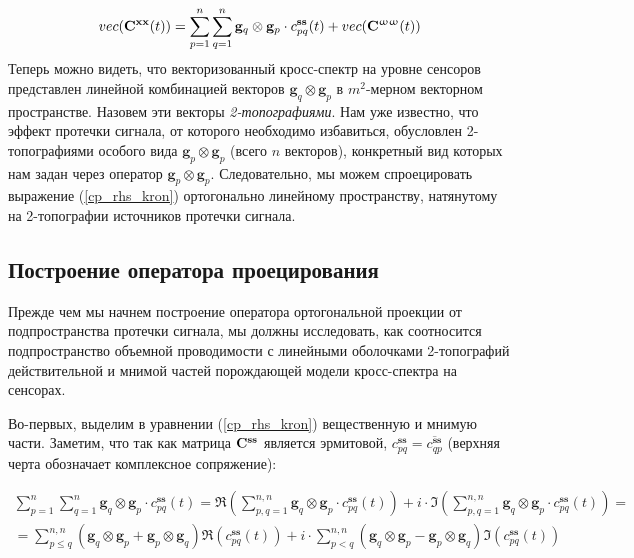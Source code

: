 \begin{equation}
    vec(\mathbf{C}^{\mathbf{x x}}(t)) = \sum\limits_{p=1}^n\sum\limits_{q=1}^n \mathbf{g}_q\otimes \mathbf{g}_p \cdot c_{pq}^{\mathbf{ss}}(t) + vec(\mathbf{C}^{\mathbf{\upomega \upomega}}(t))
    \label{cp_rhs_kron}
\end{equation}
Теперь можно видеть, что векторизованный кросс-спектр на уровне сенсоров представлен линейной комбинацией векторов $\mathbf{g}_q \otimes \mathbf{g}_p$ в $m^2$-мерном векторном пространстве. Назовем эти векторы \emph{2-топографиями}. Нам уже известно, что эффект протечки сигнала, от которого необходимо избавиться, обусловлен 2-топографиями особого вида $\mathbf{g}_p \otimes \mathbf{g}_p$ (всего $n$ векторов), конкретный вид которых нам задан через оператор $\mathbf{g}_p \otimes \mathbf{g}_p$. Следовательно, мы можем спроецировать выражение (\ref{cp_rhs_kron})  ортогонально линейному пространству, натянутому на 2-топографии источников протечки сигнала.

\subsection{Построение оператора проецирования}
Прежде чем мы начнем построение оператора ортогональной проекции от подпространства протечки сигнала,
мы должны исследовать, как соотносится подпространство объемной проводимости с линейными оболочками
2-топографий действительной и мнимой частей порождающей модели кросс-спектра на сенсорах.

Во-первых, выделим в уравнении (\ref{cp_rhs_kron}) вещественную и мнимую части.
Заметим, что так как матрица $\mathbf{C}^{\mathbf{s s}}$ является эрмитовой,
$c^{\mathbf{ss}}_{pq} = \overline{c^{\mathbf{ss}}_{qp}}$ (верхняя черта обозначает комплексное сопряжение):

\begin{gather}
                      \sum\limits_{p=1}^n\sum\limits_{q=1}^n \mathbf{g}_q\otimes \mathbf{g}_p \cdot c_{pq}^{\mathbf{ss}}(t) =
             \Re\left(\sum\limits_{p,q=1}^{n,n} \mathbf{g}_q\otimes \mathbf{g}_p \cdot c_{pq}^{\mathbf{ss}}(t)\right) +
     i \cdot \Im\left(\sum\limits_{p,q=1}^{n,n} \mathbf{g}_q\otimes \mathbf{g}_p \cdot c_{pq}^{\mathbf{ss}}(t)\right) = \nonumber \\
           = \sum\limits_{p\leq q}^{n,n} (\mathbf{g}_q\otimes \mathbf{g}_p + \mathbf{g}_p\otimes \mathbf{g}_q) 
                                                                                    \Re\left(c_{pq}^{\mathbf{ss}}(t)\right) +
     i \cdot \sum\limits_{p<q}^{n,n} (\mathbf{g}_q\otimes \mathbf{g}_p - \mathbf{g}_p\otimes \mathbf{g}_q)
                                                                                    \Im\left(c_{pq}^{\mathbf{ss}}(t)\right)
    \label{cp_re_im}
\end{gather} 

